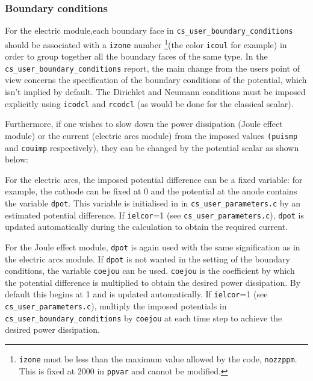 {{{%
\subsubsection{Boundary conditions}

For the electric module,each boundary face in \texttt{cs\_user\_boundary\_conditions} should be associated with a
 \texttt{izone} number \footnote{\texttt{izone} must be less than the maximum
 value allowed by the code, \texttt{nozzppm}. This is fixed at 2000 in \texttt
{ppvar} and cannot be modified.}(the color \texttt{icoul} for example) in
 order to group together all the boundary faces of the same type. In the
 \texttt{cs\_user\_boundary\_conditions} report, the main change from the users point of view concerns the
 specification of the boundary conditions of the potential, which isn't
 implied by default. The Dirichlet and Neumann conditions must be imposed
 explicitly using \texttt{icodcl} and \texttt{rcodcl} (as would be done for
 the classical scalar).

Furthermore, if one wishes to slow down the power dissipation (Joule
effect module) or the current (electric arcs module) from the imposed values
\texttt{(puismp} and \texttt{couimp} respectively),
 they can be changed by the potential scalar as shown below:

\begin{list}{-}{}
\item For the electric arcs, the imposed potential difference can be a fixed variable:
 for example, the cathode can be fixed at 0 and the potential at the anode
 contains the variable \texttt{dpot}. This variable is initialised in
in \texttt{cs\_user\_parameters.c}
 by an estimated potential difference. If \texttt{ielcor}=1 (see
 \texttt{cs\_user\_parameters.c}), \texttt{dpot} is updated automatically during the
 calculation to obtain the required current.
\item For the Joule effect module, \texttt{dpot} is again used with the same
 signification as in the electric arcs module. If \texttt{dpot} is not wanted
 in the setting of the boundary conditions, the variable \texttt{coejou} can be
 used. \texttt{coejou} is the coefficient by which the potential difference is
 multiplied to obtain the desired power dissipation. By default this begins at
 1 and is updated automatically. If \texttt{ielcor}=1 (see \texttt
{cs\_user\_parameters.c}), multiply the imposed potentials in
\texttt{cs\_user\_boundary\_conditions} by \texttt{coejou} at each time step to
achieve the desired power dissipation.
 \end{list}

}}}
